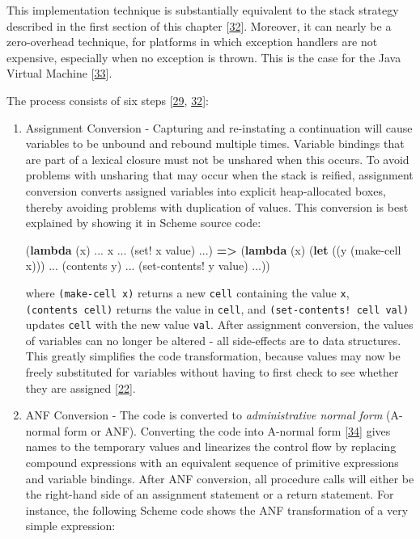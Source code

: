 \documentclass[12pt,a4paper,oneside,openright]{book}
\newenvironment{Shaded}{\begin{snugshade}}{\end{snugshade}}
\newcommand{\KeywordTok}[1]{\textcolor[rgb]{0.13,0.29,0.53}{\textbf{{#1}}}}
\newcommand{\NormalTok}[1]{{#1}}
\begin{document}
This implementation technique is substantially equivalent to the stack
strategy described in the first section of this chapter
{[}\hyperref[ref-StackHack2005]{32}{]}. Moreover, it can nearly be a
zero-overhead technique, for platforms in which exception handlers are
not expensive, especially when no exception is thrown. This is the case
for the Java Virtual Machine {[}\hyperref[ref-Longjumps2015]{33}{]}.

The process consists of six steps {[}\hyperref[ref-Marshall2009]{29},
\hyperref[ref-StackHack2005]{32}{]}:

\begin{enumerate}
\def\labelenumi{\arabic{enumi}.}
\item
  Assignment Conversion - Capturing and re-instating a continuation will
  cause variables to be unbound and rebound multiple times. Variable
  bindings that are part of a lexical closure must not be unshared when
  this occurs. To avoid problems with unsharing that may occur when the
  stack is reified, assignment conversion converts assigned variables
  into explicit heap-allocated boxes, thereby avoiding problems with
  duplication of values. This conversion is best explained by showing it
  in Scheme source code:

\begin{Shaded}
\begin{Highlighting}[]
\NormalTok{(}\KeywordTok{lambda} \NormalTok{(x) ... x ... (set! x value) ...)}
    \KeywordTok{=>}
\NormalTok{(}\KeywordTok{lambda} \NormalTok{(x)}
    \NormalTok{(}\KeywordTok{let} \NormalTok{((y (make-cell x)))}
        \NormalTok{... (contents y) ... (set-contents! y value) ...))}
\end{Highlighting}
\end{Shaded}

  where \texttt{(make-cell\ x)} returns a new \texttt{cell} containing
  the value \texttt{x}, \texttt{(contents\ cell)} returns the value in
  \texttt{cell}, and \texttt{(set-contents!\ cell\ val)} updates
  \texttt{cell} with the new value \texttt{val}. After assignment
  conversion, the values of variables can no longer be altered - all
  side-effects are to data structures. This greatly simplifies the code
  transformation, because values may now be freely substituted for
  variables without having to first check to see whether they are
  assigned {[}\hyperref[ref-adams1986orbit]{22}{]}.
\item
  ANF Conversion - The code is converted to \emph{administrative normal
  form} (A-normal form or ANF). Converting the code into A-normal form
  {[}\hyperref[ref-Flanagan1993]{34}{]} gives names to the temporary
  values and linearizes the control flow by replacing compound
  expressions with an equivalent sequence of primitive expressions and
  variable bindings. After ANF conversion, all procedure calls will
  either be the right-hand side of an assignment statement or a return
  statement. For instance, the following Scheme code shows the ANF
  transformation of a very simple expression:


\end{enumerate}
\end{document}
